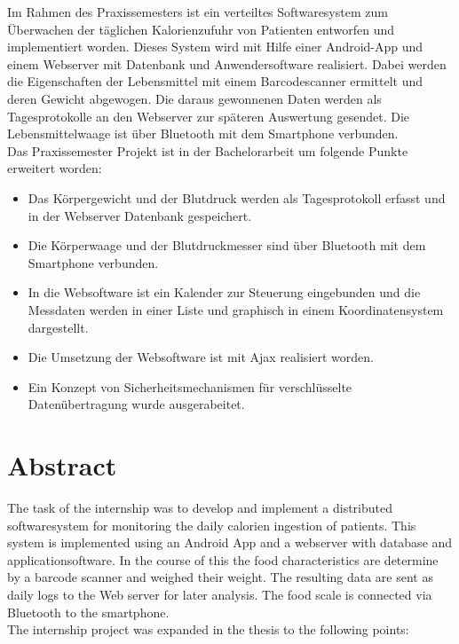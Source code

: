  
Im Rahmen des Praxissemesters ist ein verteiltes Softwaresystem zum \"Uberwachen der t\"aglichen Kalorienzufuhr von Patienten
entworfen und implementiert worden.
Dieses System wird mit Hilfe einer Android-App und einem Webserver mit Datenbank und Anwendersoftware realisiert.
Dabei werden die Eigenschaften der Lebensmittel mit einem Barcodescanner ermittelt und deren Gewicht abgewogen.
Die daraus gewonnenen Daten werden als Tagesprotokolle an den Webserver zur sp\"ateren Auswertung gesendet.
Die Lebensmittelwaage ist \"uber Bluetooth mit dem Smartphone verbunden.\\

Das Praxissemester Projekt ist in der Bachelorarbeit um folgende Punkte erweitert worden:

\begin{itemize}
 \item Das K\"orpergewicht und der Blutdruck werden als Tagesprotokoll erfasst und in der Webserver Datenbank gespeichert.
 \item Die K\"orperwaage und der Blutdruckmesser sind \"uber Bluetooth mit dem Smartphone verbunden.
 \item In die Websoftware ist ein Kalender zur Steuerung eingebunden und die Messdaten werden in einer Liste und graphisch in einem Koordinatensystem dargestellt.
 \item Die Umsetzung der Websoftware ist mit Ajax realisiert worden.
 \item Ein Konzept von Sicherheitsmechanismen f\"ur verschl\"usselte Daten\"ubertragung wurde ausgerabeitet.
\end{itemize}




\section*{Abstract}

The task of the internship was to develop and implement a distributed softwaresystem for monitoring the daily calorien ingestion of patients.
This system is implemented using an Android App and a webserver with database and applicationsoftware.
In the course of this the food characteristics are determine by a barcode scanner and weighed their weight.
The resulting data are sent as daily logs to the Web server for later analysis.
The food scale is connected via Bluetooth to the smartphone.\\

The internship project was expanded in the thesis to the following points:

